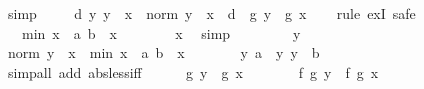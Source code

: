 \begin{isabellebody}
\ simp\isanewline
\ \ \isamarkupfalse%
\ {}{\isacharcolon}{\kern0pt}\ {\isachardoublequoteopen}{\isasymexists}d{\isachargreater}{\kern0pt}{}{\isachardot}{\kern0pt}\ {\isasymforall}y{\isachardot}{\kern0pt}\ y\ {\isasymnoteq}\ x\ {\isasymand}\ norm\ {\isacharparenleft}{\kern0pt}y\ {\isacharminus}{\kern0pt}\ x{\isacharparenright}{\kern0pt}\ {\isacharless}{\kern0pt}\ d\ {\isasymlongrightarrow}\ g\ y\ {\isasymnoteq}\ g\ x{\isachardoublequoteclose}\isanewline
\ \ \isamarkupfalse%
\ {\isacharparenleft}{\kern0pt}rule\ exI{\isacharcomma}{\kern0pt}\ safe{\isacharparenright}{\kern0pt}\isanewline
\ \ \ \ \isamarkupfalse%
\ {\isachardoublequoteopen}{}\ {\isacharless}{\kern0pt}\ min\ {\isacharparenleft}{\kern0pt}x\ {\isacharminus}{\kern0pt}\ a{\isacharparenright}{\kern0pt}\ {\isacharparenleft}{\kern0pt}b\ {\isacharminus}{\kern0pt}\ x{\isacharparenright}{\kern0pt}{\isachardoublequoteclose}\isanewline
\ \ \ \ \ \ \isamarkupfalse%
\ x\ \isamarkupfalse%
\ simp\isanewline
\ \ \isamarkupfalse%
\isanewline
\ \ \ \ \isamarkupfalse%
\ y\isanewline
\ \ \ \ \isamarkupfalse%
\ {\isachardoublequoteopen}norm\ {\isacharparenleft}{\kern0pt}y\ {\isacharminus}{\kern0pt}\ x{\isacharparenright}{\kern0pt}\ {\isacharless}{\kern0pt}\ min\ {\isacharparenleft}{\kern0pt}x\ {\isacharminus}{\kern0pt}\ a{\isacharparenright}{\kern0pt}\ {\isacharparenleft}{\kern0pt}b\ {\isacharminus}{\kern0pt}\ x{\isacharparenright}{\kern0pt}{\isachardoublequoteclose}\isanewline
\ \ \ \ \isamarkupfalse%
\ \isamarkupfalse%
\ y{\isacharcolon}{\kern0pt}\ {\isachardoublequoteopen}a\ {\isacharless}{\kern0pt}\ y{\isachardoublequoteclose}\ {\isachardoublequoteopen}y\ {\isacharless}{\kern0pt}\ b{\isachardoublequoteclose}\isanewline
\ \ \ \ \ \ \isamarkupfalse%
\ {\isacharparenleft}{\kern0pt}simp{\isacharunderscore}{\kern0pt}all\ add{\isacharcolon}{\kern0pt}\ abs{\isacharunderscore}{\kern0pt}less{\isacharunderscore}{\kern0pt}iff{\isacharparenright}{\kern0pt}\isanewline
\ \ \ \ \isamarkupfalse%
\ {\isachardoublequoteopen}g\ y\ {\isacharequal}{\kern0pt}\ g\ x{\isachardoublequoteclose}\isanewline
\ \ \ \ \isamarkupfalse%
\ \isamarkupfalse%
\ {\isachardoublequoteopen}f\ {\isacharparenleft}{\kern0pt}g\ y{\isacharparenright}{\kern0pt}\ {\isacharequal}{\kern0pt}\ f\ {\isacharparenleft}{\kern0pt}g\ x{\isacharparenright}{\kern0pt}{\isachardoublequoteclose}\ \isamarkupfalse%

\end{isabellebody}
